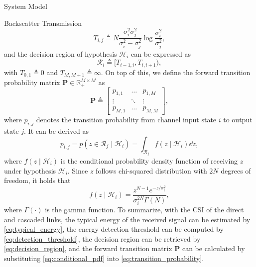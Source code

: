 \documentclass[journal]{IEEEtran}
\begin{document}
\begin{section}{System Model}
\begin{subsection}{Backscatter Transmission}
\begin{equation}
				T_{i, j} \triangleq N \frac{\sigma_i^2 \sigma_j^2}{\sigma_i^2 - \sigma_j^2} \log \frac{\sigma_i^2}{\sigma_j^2},
				\label{eq:detection_threshold}
			\end{equation}
			and the decision region of hypothesis $\mathcal{H}_i$ can be expressed as
			\begin{equation}
				\mathcal{R}_i \triangleq [T_{i-1, i}, T_{i, i+1}),
				\label{eq:decision_region}
			\end{equation}
			with $T_{0, 1} \triangleq 0$ and $T_{M, M+1} \triangleq \infty$. On top of this, we define the forward transition probability matrix $\boldsymbol{P} \in \mathbb{R}_{+}^{M \times M}$ as
			\begin{equation}
				\boldsymbol{P} \triangleq
				\begin{bmatrix}
					p_{1, 1} & \ldots & p_{1, M} \\
					\vdots & \ddots & \vdots \\
					p_{M, 1} & \ldots & p_{M, M}
				\end{bmatrix},
			\end{equation}
			where $p_{i, j}$ denotes the transition probability from channel input state $i$ to output state $j$. It can be derived as
			\begin{equation}
				p_{i, j} = p(z \in \mathcal{R}_j \mid \mathcal{H}_i) = \int_{\mathcal{R}_j} f(z \mid \mathcal{H}_i) \dd z,
				\label{eq:transition_probability}
			\end{equation}
			where $f(z \mid \mathcal{H}_i)$ is the conditional probability density function of receiving $z$ under hypothesis $\mathcal{H}_i$. Since $z$ follows chi-squared distribution with $2N$ degrees of freedom, it holds that
			\begin{equation}
				f(z \mid \mathcal{H}_i) = \frac{z^{N-1} e^{-z/\sigma_i^2}}{\sigma_i^{2N} \Gamma(N)},
				\label{eq:conditional_pdf}
			\end{equation}
			where $\Gamma(\cdot)$ is the gamma function. To summarize, with the CSI of the direct and cascaded links, the typical energy of the received signal can be estimated by \eqref{eq:typical_energy}, the energy detection threshold can be computed by \eqref{eq:detection_threshold}, the decision region can be retrieved by \eqref{eq:decision_region}, and the forward transition matrix $\boldsymbol{P}$ can be calculated by substituting \eqref{eq:conditional_pdf} into \eqref{eq:transition_probability}.


\end{subsection}
\end{section}
\end{document}
